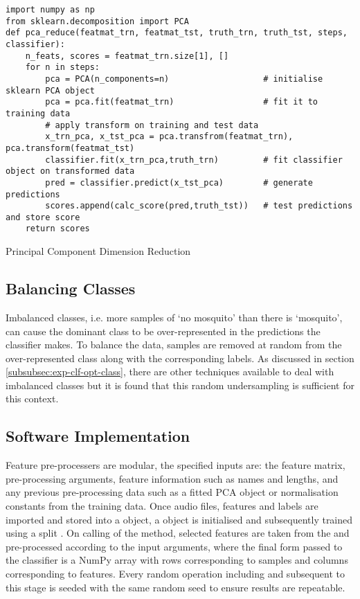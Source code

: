         \begin{listing}[ht]
            \begin{verbatim}
import numpy as np
from sklearn.decomposition import PCA
def pca_reduce(featmat_trn, featmat_tst, truth_trn, truth_tst, steps, classifier):
    n_feats, scores = featmat_trn.size[1], []
    for n in steps:
        pca = PCA(n_components=n)                   # initialise sklearn PCA object
        pca = pca.fit(featmat_trn)                  # fit it to training data
        # apply transform on training and test data
        x_trn_pca, x_tst_pca = pca.transfrom(featmat_trn), pca.transform(featmat_tst)
        classifier.fit(x_trn_pca,truth_trn)         # fit classifier object on transformed data
        pred = classifier.predict(x_tst_pca)        # generate predictions
        scores.append(calc_score(pred,truth_tst))   # test predictions and store score
    return scores
            \end{verbatim}
            \caption{Principal Component Dimension Reduction}
            \label{code:pl-featpreproc-sel-pca}
        \end{listing} 
    
    \subsection{Balancing Classes}
    \label{subsec:pl-featpreproc-bal}
        Imbalanced classes, i.e. more samples of `no mosquito' than there is `mosquito', can cause the dominant class to be over-represented in the predictions the classifier makes. To balance the data, samples are removed at random from the over-represented class along with the corresponding labels. As discussed in section \ref{subsubsec:exp-clf-opt-class}, there are other techniques available to deal with imbalanced classes but it is found that this random undersampling is sufficient for this context.
    
    \subsection{Software Implementation}
    \label{subsec:pl-featpreproc-software}
        Feature pre-processers are modular, the specified inputs are: the feature matrix, pre-processing arguments, feature information such as names and lengths, and any previous pre-processing data such as a fitted PCA object or normalisation constants from the training data.
        Once audio files, features and labels are imported and stored into a  object, a  object is initialised and subsequently trained using a split . On calling of the  method, selected features are taken from the  and pre-processed according to the input arguments, where the final form passed to the classifier is a NumPy array with rows corresponding to samples and columns corresponding to features. Every random operation including and subsequent to this stage is seeded with the same random seed to ensure results are repeatable.
    